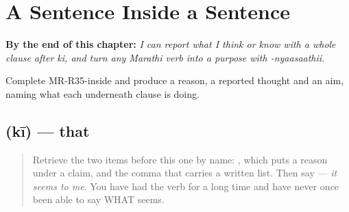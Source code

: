 
\chapter{A Sentence Inside a Sentence}
\label{ch:mr-clause-inside-clause}

\begin{chapteropening}
\textbf{By the end of this chapter:} \emph{I can report what I think or know with a whole clause after ki, and turn any Marathi verb into a purpose with -nyaasaathii.}

Complete MR-R35-inside and produce a reason, a reported thought and an aim, naming what each underneath clause is doing.
\end{chapteropening}

\section[\texorpdfstring{\mr{की} (kī)}{की (kī)}]{ (kī) — that}

\label{lesson:MR-C35-kii}



\begin{quote}
Retrieve the two items before this one by name: \textbf{}, which puts a reason under a claim, and the comma that carries a written list. Then say \textbf{ } — \emph{it seems to me}. You have had the verb for a long time and have never once been able to say WHAT seems.
\end{quote}


